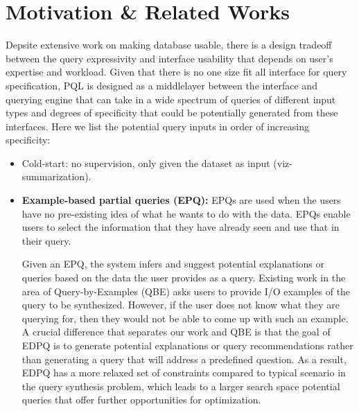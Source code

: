 \documentclass{sig-alternate-05-2015}
\begin{document}
\section{Motivation \& Related Works}
\par Depsite extensive work on making database usable, there is a design tradeoff between the query expressivity and interface usability that depends on user's expertise and workload. Given that there is no one size fit all interface for query specification, PQL is designed as a middlelayer between the interface and querying engine that can take in a wide spectrum of queries of different input types and degrees of specificity that could be potentially generated from these interfaces. Here we list the potential query inputs in order of increasing specificity: 
\begin{itemize}
\item Cold-start: no supervision, only given the dataset as input (viz-summarization).
\item \textbf{Example-based partial queries (EPQ):} EPQs are used when the users have no pre-existing idea of what he wants to do with the data. EPQs enable users to select the information that they have already seen and use that in their query. 
\par Given an EPQ, the system infers and suggest potential explanations or queries based on the data the user provides as a query. Existing work in the area of Query-by-Examples (QBE) asks users to provide I/O examples of the query to be synthesized. However, if the user does not know what they are querying for, then they would not be able to come up with such an example. A crucial difference that separates our work and QBE is that the goal of EDPQ is to generate potential explanations or query recommendations rather than generating a query that will address a predefined question. As a result, EDPQ has a more relaxed set of constraints compared to typical scenario in the query synthesis problem, which leads to a larger search space potential queries that offer further opportunities for optimization.

\end{itemize}
\end{document}
